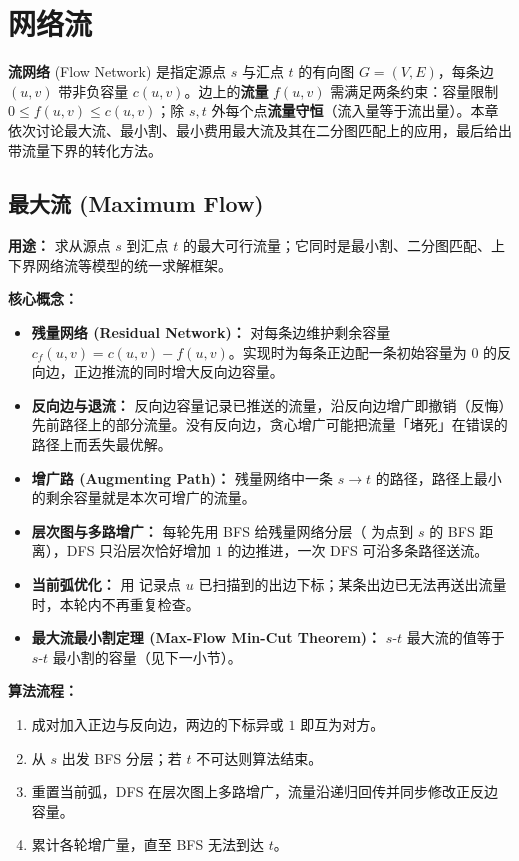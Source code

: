 \section{网络流}

\textbf{流网络} (Flow Network) 是指定源点 $s$ 与汇点 $t$ 的有向图 $G=(V,E)$，每条边 $(u,v)$ 带非负容量 $c(u,v)$。边上的\textbf{流量} $f(u,v)$ 需满足两条约束：容量限制 $0 \le f(u,v) \le c(u,v)$；除 $s,t$ 外每个点\textbf{流量守恒}（流入量等于流出量）。本章依次讨论最大流、最小割、最小费用最大流及其在二分图匹配上的应用，最后给出带流量下界的转化方法。

\subsection{最大流 (Maximum Flow)}

\textbf{用途：} 求从源点 $s$ 到汇点 $t$ 的最大可行流量；它同时是最小割、二分图匹配、上下界网络流等模型的统一求解框架。

\textbf{核心概念：}
\begin{itemize}
  \item \textbf{残量网络 (Residual Network)：} 对每条边维护剩余容量 $c_f(u,v)=c(u,v)-f(u,v)$。实现时为每条正边配一条初始容量为 $0$ 的反向边，正边推流的同时增大反向边容量。
  \item \textbf{反向边与退流：} 反向边容量记录已推送的流量，沿反向边增广即撤销（反悔）先前路径上的部分流量。没有反向边，贪心增广可能把流量「堵死」在错误的路径上而丢失最优解。
  \item \textbf{增广路 (Augmenting Path)：} 残量网络中一条 $s \to t$ 的路径，路径上最小的剩余容量就是本次可增广的流量。
  \item \textbf{层次图与多路增广：} 每轮先用 BFS 给残量网络分层（ 为点到 $s$ 的 BFS 距离），DFS 只沿层次恰好增加 $1$ 的边推进，一次 DFS 可沿多条路径送流。
  \item \textbf{当前弧优化：} 用  记录点 $u$ 已扫描到的出边下标；某条出边已无法再送出流量时，本轮内不再重复检查。
  \item \textbf{最大流最小割定理 (Max-Flow Min-Cut Theorem)：} $s$-$t$ 最大流的值等于 $s$-$t$ 最小割的容量（见下一小节）。
\end{itemize}

\textbf{算法流程：}
\begin{enumerate}
  \item {} 成对加入正边与反向边，两边的下标异或 $1$ 即互为对方。
  \item 从 $s$ 出发 BFS 分层；若 $t$ 不可达则算法结束。
  \item 重置当前弧，DFS 在层次图上多路增广，流量沿递归回传并同步修改正反边容量。
  \item 累计各轮增广量，直至 BFS 无法到达 $t$。
\end{enumerate}

